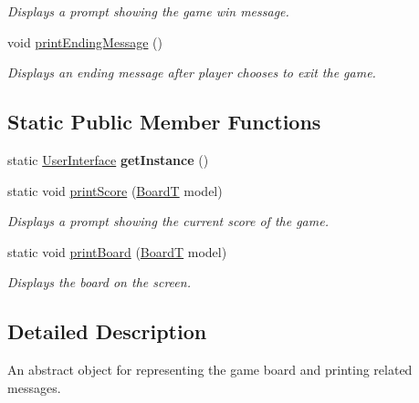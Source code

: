 \begin{DoxyCompactItemize}
\begin{DoxyCompactList}\small\item\em Displays a prompt showing the game win message. \end{DoxyCompactList}\item 
\mbox{\label{classsrc_1_1UserInterface_ae78e2dff34b8098ec836a6bd18c67b8f}} 
void \hyperlink{classsrc_1_1UserInterface_ae78e2dff34b8098ec836a6bd18c67b8f}{print\+Ending\+Message} ()
\begin{DoxyCompactList}\small\item\em Displays an ending message after player chooses to exit the game. \end{DoxyCompactList}\end{DoxyCompactItemize}
\subsection*{Static Public Member Functions}
\begin{DoxyCompactItemize}
\item 
\mbox{\label{classsrc_1_1UserInterface_a15de01de7b9cb8900d54e3c123287901}} 
static \hyperlink{classsrc_1_1UserInterface}{User\+Interface} {\bfseries get\+Instance} ()
\item 
\mbox{\label{classsrc_1_1UserInterface_ae036de5eff48a099a12dc1cf560f2b5a}} 
static void \hyperlink{classsrc_1_1UserInterface_ae036de5eff48a099a12dc1cf560f2b5a}{print\+Score} (\hyperlink{classsrc_1_1BoardT}{BoardT} model)
\begin{DoxyCompactList}\small\item\em Displays a prompt showing the current score of the game. \end{DoxyCompactList}\item 
static void \hyperlink{classsrc_1_1UserInterface_a853bb521a3732a56c99233034edaeb7d}{print\+Board} (\hyperlink{classsrc_1_1BoardT}{BoardT} model)
\begin{DoxyCompactList}\small\item\em Displays the board on the screen. \end{DoxyCompactList}\end{DoxyCompactItemize}


\subsection{Detailed Description}
An abstract object for representing the game board and printing related messages. 

